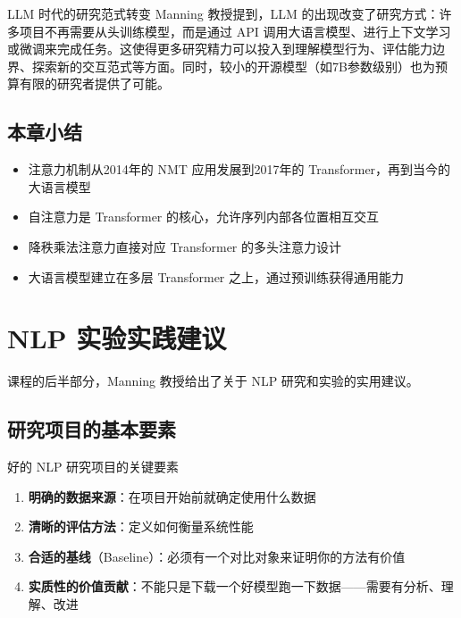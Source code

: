\documentclass[a4paper]{article}
\begin{document}
\begin{knowledgebox}{LLM 时代的研究范式转变}
Manning 教授提到，LLM 的出现改变了研究方式：许多项目不再需要从头训练模型，而是通过 API 调用大语言模型、进行上下文学习或微调来完成任务。这使得更多研究精力可以投入到理解模型行为、评估能力边界、探索新的交互范式等方面。同时，较小的开源模型（如7B参数级别）也为预算有限的研究者提供了可能。
\end{knowledgebox}

\subsection{本章小结}

\begin{itemize}
    \item 注意力机制从2014年的 NMT 应用发展到2017年的 Transformer，再到当今的大语言模型
    \item 自注意力是 Transformer 的核心，允许序列内部各位置相互交互
    \item 降秩乘法注意力直接对应 Transformer 的多头注意力设计
    \item 大语言模型建立在多层 Transformer 之上，通过预训练获得通用能力
\end{itemize}


\section{NLP 实验实践建议}

课程的后半部分，Manning 教授给出了关于 NLP 研究和实验的实用建议。

\subsection{研究项目的基本要素}

\begin{importantbox}{好的 NLP 研究项目的关键要素}
\begin{enumerate}
    \item \textbf{明确的数据来源}：在项目开始前就确定使用什么数据
    \item \textbf{清晰的评估方法}：定义如何衡量系统性能
    \item \textbf{合适的基线}（Baseline）：必须有一个对比对象来证明你的方法有价值
    \item \textbf{实质性的价值贡献}：不能只是下载一个好模型跑一下数据——需要有分析、理解、改进
\end{enumerate}
\end{importantbox}
\end{document}
